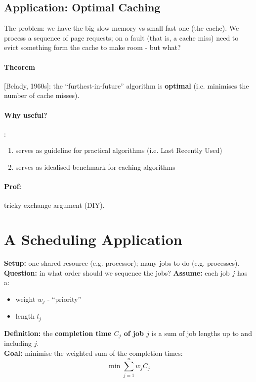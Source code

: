 \documentclass{scrartcl}
\begin{document}
\subsection{Application: Optimal Caching}
\label{sec:3-2}
The problem: we have the big slow memory vs small fast one (the cache). We
process a sequence of page requests; on a fault (that is, a cache miss) need to
evict something form the cache to make room - but what?

\paragraph{Theorem} [Belady, 1960s]: the ``furthest-in-future'' algorithm is
{\bf optimal} (i.e. minimises the number of cache misses).

\paragraph{Why useful?}:
\begin{enumerate}
\item serves as guideline for practical algorithms (i.e. Last Recently Used)
\item serves as idealised benchmark for caching algorithms
\end{enumerate}
\paragraph{Prof:} tricky exchange argument (DIY).

\section{A Scheduling Application}
\label{sec:4-0} {\bf Setup:} one shared resource (e.g. processor); many jobs to
do (e.g.
processes).\\
{\bf Question:} in what order should we sequence the jobs? {\bf Assume:} each
job $j$ has a:
\begin{itemize}
\item weight $w_j$ - ``priority''
\item length $l_j$
\end{itemize} {\bf Definition:} the {\bf completion time $C_j$ of job $j$} is a
sum
of job lengths up to and including $j$.\\
{\bf Goal:} minimise the weighted sum of the completion times:
$$ \min \sum_{j=1}^n w_jC_j $$

\end{document}
